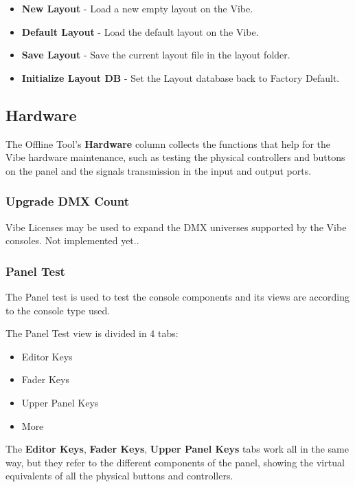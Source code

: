 \documentclass[
]{article}
\begin{document}
\begin{itemize}
\item
  \textbf{New Layout} - Load a new empty layout on the Vibe.
\item
  \textbf{Default Layout} - Load the default layout on the Vibe.
\item
  \textbf{Save Layout} - Save the current layout file in the layout folder.
\item
  \textbf{Initialize Layout DB} - Set the Layout database back to Factory Default.
\end{itemize}

\hypertarget{hardware-2}{%
\subsection{Hardware}\label{hardware-2}}

The Offline Tool's \textbf{Hardware} column collects the functions that help for the Vibe hardware maintenance, such as testing the physical controllers and buttons on the panel and the signals transmission in the input and output ports.

\hypertarget{upgrade-dmx-count}{%
\subsubsection{Upgrade DMX Count}\label{upgrade-dmx-count}}

{ Vibe Licenses may be used to expand the DMX universes supported by the Vibe consoles. Not implemented yet.}.

\hypertarget{panel-test}{%
\subsubsection{Panel Test}\label{panel-test}}

The Panel test is used to test the console components and its views are according to the console type used.

The Panel Test view is divided in 4 tabs:

\begin{itemize}
\item
  Editor Keys
\item
  Fader Keys
\item
  Upper Panel Keys
\item
  More
\end{itemize}

The \textbf{Editor Keys}, \textbf{Fader Keys}, \textbf{Upper Panel Keys} tabs work all in the same way, but they refer to the different components of the panel, showing the virtual equivalents of all the physical buttons and controllers.
\end{document}
